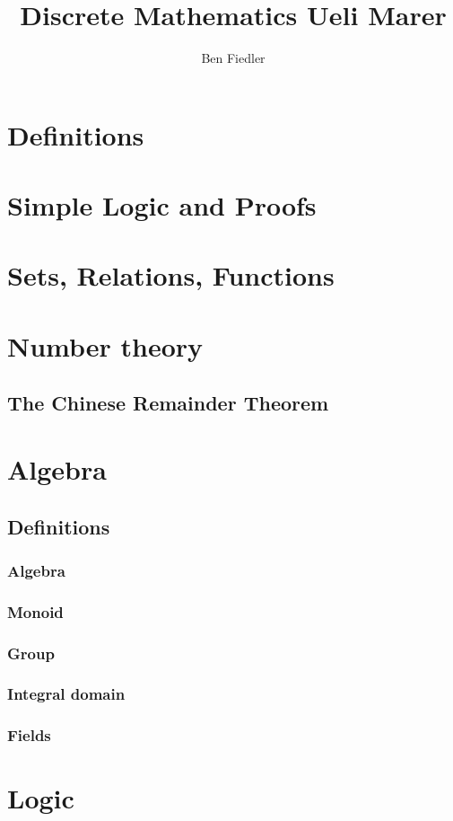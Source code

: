 \documentclass[a4paper,12pt]{article}
\begin{document}
\author{Ben Fiedler}
\title{Discrete Mathematics \vspace{.5cm}
       \large{Ueli Marer}}
\date{ }

\maketitle
\tableofcontents

\newpage

\section{Definitions}

\section{Simple Logic and Proofs}

\section{Sets, Relations, Functions}

\section{Number theory}

\subsection{The Chinese Remainder Theorem}

\section{Algebra}

\subsection{Definitions}

\subsubsection{Algebra}

\subsubsection{Monoid}

\subsubsection{Group}

\subsubsection{Integral domain}

\subsubsection{Fields}

\section{Logic}
\end{document}
